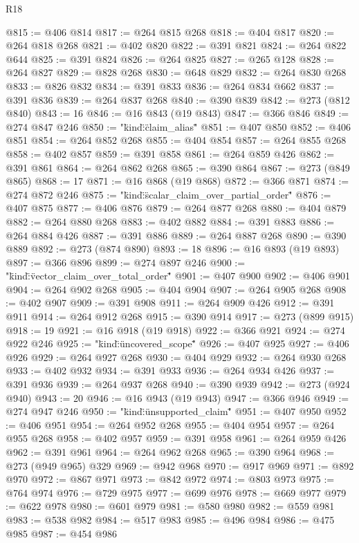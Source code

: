 \begin{lexlean}{R18}
\begin{coremodule}
{{{{{{{{{{{{{{@815 := @406 @814
@817 := @264 @815 @268
@818 := @404 @817
@820 := @264 @818 @268
@821 := @402 @820
@822 := @391 @821
@824 := @264 @822 @644
@825 := @391 @824
@826 := @264 @825
@827 := @265 @128
@828 := @264 @827
@829 := @828 @268
@830 := @648 @829
@832 := @264 @830 @268
@833 := @826 @832
@834 := @391 @833
@836 := @264 @834 @662
@837 := @391 @836
@839 := @264 @837 @268
@840 := @390 @839
@842 := @273 (@812 @840)
@843 := 16
@846 := @16 @843 (@19 @843)
@847 := @366 @846
@849 := @274 @847 @246
@850 := "{\"kind\":\"claim_alias\""
@851 := @407 @850
@852 := @406 @851
@854 := @264 @852 @268
@855 := @404 @854
@857 := @264 @855 @268
@858 := @402 @857
@859 := @391 @858
@861 := @264 @859 @426
@862 := @391 @861
@864 := @264 @862 @268
@865 := @390 @864
@867 := @273 (@849 @865)
@868 := 17
@871 := @16 @868 (@19 @868)
@872 := @366 @871
@874 := @274 @872 @246
@875 := "{\"kind\":\"scalar_claim_over_partial_order\""
@876 := @407 @875
@877 := @406 @876
@879 := @264 @877 @268
@880 := @404 @879
@882 := @264 @880 @268
@883 := @402 @882
@884 := @391 @883
@886 := @264 @884 @426
@887 := @391 @886
@889 := @264 @887 @268
@890 := @390 @889
@892 := @273 (@874 @890)
@893 := 18
@896 := @16 @893 (@19 @893)
@897 := @366 @896
@899 := @274 @897 @246
@900 := "{\"kind\":\"vector_claim_over_total_order\""
@901 := @407 @900
@902 := @406 @901
@904 := @264 @902 @268
@905 := @404 @904
@907 := @264 @905 @268
@908 := @402 @907
@909 := @391 @908
@911 := @264 @909 @426
@912 := @391 @911
@914 := @264 @912 @268
@915 := @390 @914
@917 := @273 (@899 @915)
@918 := 19
@921 := @16 @918 (@19 @918)
@922 := @366 @921
@924 := @274 @922 @246
@925 := "{\"kind\":\"uncovered_scope\""
@926 := @407 @925
@927 := @406 @926
@929 := @264 @927 @268
@930 := @404 @929
@932 := @264 @930 @268
@933 := @402 @932
@934 := @391 @933
@936 := @264 @934 @426
@937 := @391 @936
@939 := @264 @937 @268
@940 := @390 @939
@942 := @273 (@924 @940)
@943 := 20
@946 := @16 @943 (@19 @943)
@947 := @366 @946
@949 := @274 @947 @246
@950 := "{\"kind\":\"unsupported_claim\""
@951 := @407 @950
@952 := @406 @951
@954 := @264 @952 @268
@955 := @404 @954
@957 := @264 @955 @268
@958 := @402 @957
@959 := @391 @958
@961 := @264 @959 @426
@962 := @391 @961
@964 := @264 @962 @268
@965 := @390 @964
@968 := @273 (@949 @965) @329
@969 := @942 @968
@970 := @917 @969
@971 := @892 @970
@972 := @867 @971
@973 := @842 @972
@974 := @803 @973
@975 := @764 @974
@976 := @729 @975
@977 := @699 @976
@978 := @669 @977
@979 := @622 @978
@980 := @601 @979
@981 := @580 @980
@982 := @559 @981
@983 := @538 @982
@984 := @517 @983
@985 := @496 @984
@986 := @475 @985
@987 := @454 @986
}}}}}}}}}}}}}}}}}}}
\end{coremodule}
\end{lexlean}

